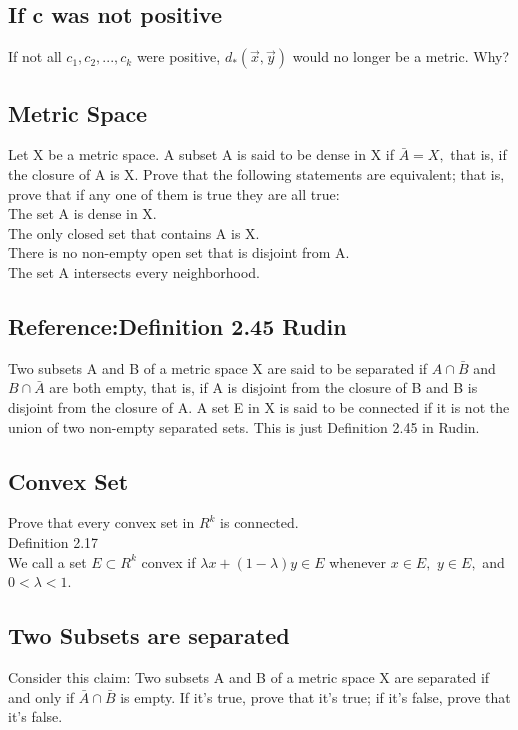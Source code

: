 \subsection{If c was not positive} 
If not all $c_1,c_2, ...,c_k$ were positive, $d_{*}(\vec{x}, \vec{y})$ would no longer be a metric. Why? 
\subsection*{Metric Space}
Let X be a metric space. A subset A is said to be dense in X if $\bar{A}=X,$ that is, if the closure of A is X. Prove that the following statements are equivalent; that is, prove that if any one of them is true they are all true:\\ 
The set A is dense in X. \\ 
The only closed set that contains A is X. \\ 
There is no non-empty open set that is disjoint from A. \\ 
The set A intersects every neighborhood. \\ 
\subsection*{Reference:Definition 2.45 Rudin}
Two subsets A and B of a metric space X are said to be separated if $A \cap \bar{B}$ and $B \cap \bar{A}$ are both empty, that is, if A is disjoint from the closure of B and B is disjoint from the closure of A. A set E in X is said to be connected if it is not the union of two non-empty separated sets. This is just Definition 2.45 in Rudin. \\ 
\subsection{Convex Set}
Prove that every convex set in $R^k$ is connected. \\ 
Definition 2.17 \\ 
We call a set $E \subset R^k$ convex if $\lambda x + (1- \lambda) y \in E$ whenever $x \in E,$ $y \in E,$ and $ 0< \lambda <1.$
\subsection{Two Subsets are separated}
Consider this claim: Two subsets A and B of a metric space X are separated if and only if $\bar{A} \cap \bar{B}$ is empty. If it's true, prove that it's true; if it's false, prove that it's false. \\ 
